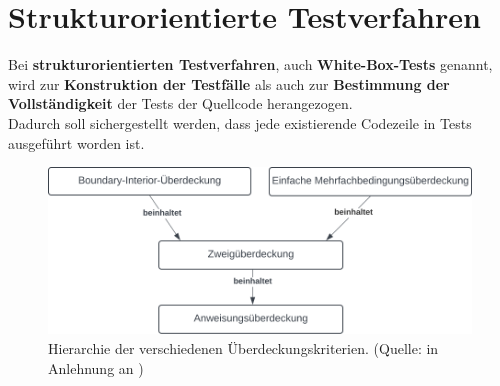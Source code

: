 \section{Strukturorientierte Testverfahren}

\begin{tcolorbox}[title=Strukturorientierte Testverfahren]
    Bei \textbf{strukturorientierten Testverfahren}, auch \textbf{White-Box-Tests} genannt, wird zur \textbf{Konstruktion der Testfälle} als auch zur \textbf{Bestimmung der Vollständigkeit} der Tests der Quellcode herangezogen.\\
    Dadurch soll sichergestellt werden, dass jede existierende Codezeile in Tests ausgeführt worden ist.
\end{tcolorbox}



\begin{figure}
    \centering
    \includegraphics[scale=0.4]{part four/Testende Verfahren/img/coverage-criteria-hierarchy}
    \caption{Hierarchie der verschiedenen Überdeckungskriterien. (Quelle: in Anlehnung an \cite[Abb. 5.2, 53]{Wed09c})}
    \label{fig:coverage-criteria-hierarchy-cc}
\end{figure}
